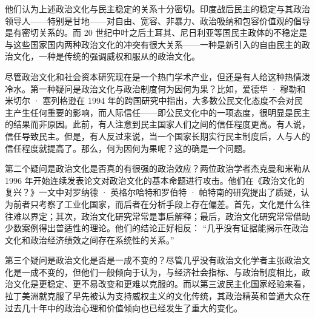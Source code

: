 
他们认为上述政治文化与民主稳定的关系十分密切。印度战后民主的稳定与其政治领导人——特别是甘地——对自由、宽容、非暴力、政治吸纳和包容价值观的倡导是有密切关系的。而 20 世纪中叶之后土耳其、尼日利亚等国民主政体的不稳定是与这些国家国内两种政治文化的冲突有很大关系——一种是新引入的自由民主的政治文化，一种是传统的强调威权和服从的政治文化。

尽管政治文化和社会资本研究现在是一个热门学术产业，但还是有人给这种热情泼冷水。第一种疑问是政治文化与政治制度何为因何为果？比如，爱德华 · 穆勒和米切尔 · 塞列格逊在 1994 年的跨国研究中指出，大多数公民文化态度不会对民主产生任何重要的影响，而人际信任——即公民文化中的一项态度，很明显是民主的结果而非原因。此前，有人注意到民主国家人们之间的信任程度更高。有人说，信任导致民主。但是，有人反过来说，当一个国家长期实行民主制度后，人与人的信任程度就提高了。那么，何为因何为果呢？这的确是一个问题。

第二个疑问是政治文化是否真的有很强的政治效应？两位政治学者杰克曼和米勒从 1996 年开始连续发表论文对政治文化的基本命题进行攻击。他们在《政治文化的复兴？》一文中对罗纳德 · 英格尔哈特和罗伯特 · 帕特南的研究提出了质疑，认为前者只考察了工业化国家，而后者在分析手段上存在偏差。首先，文化是什么往往难以界定；其次，政治文化研究常常是事后解释；最后，政治文化研究常常借助少数案例得出普适性的理论。他们的结论正好相反： “几乎没有证据能揭示在政治文化和政治经济绩效之间存在系统性的关系。” 

第三个疑问是政治文化是否是一成不变的？尽管几乎没有政治文化学者主张政治文化是一成不变的，但他们一般倾向于认为，与经济社会指标、与政治制度相比，政治文化是更稳定、更不易改变和更难以克服的。而以第三波民主化国家经验来看，拉丁美洲就克服了早先被认为支持威权主义的文化传统，其政治精英和普通大众在过去几十年中的政治心理和价值倾向也已经发生了重大的变化。

